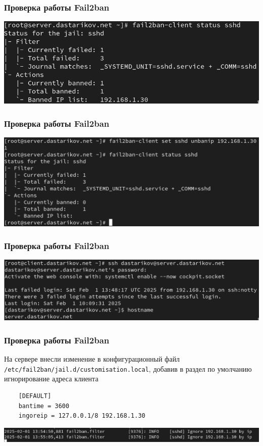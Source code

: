 \begin{frame}
\frametitle{Проверка работы Fail2ban}
    \centering
    \includegraphics[width=\textwidth]{../images/image13.png}
\end{frame}

\begin{frame}
\frametitle{Проверка работы Fail2ban}
    \centering
    \includegraphics[width=\textwidth]{../images/image14.png}
\end{frame}

\begin{frame}
\frametitle{Проверка работы Fail2ban}
    \centering
    \includegraphics[width=\textwidth]{../images/image15.png}
\end{frame}

\begin{frame}[fragile]
\frametitle{Проверка работы Fail2ban}
На сервере внесли изменение в конфигурационный файл {\tt /etc/fail2ban/jail.d/customisation.local}, добавив в раздел по умолчанию игнорирование адреса клиента
\begin{verbatim}
    [DEFAULT]
    bantime = 3600
    ingoreip = 127.0.0.1/8 192.168.1.30
\end{verbatim}

    \centering
    \includegraphics[width=\textwidth]{../images/image19.png}
\end{frame}

